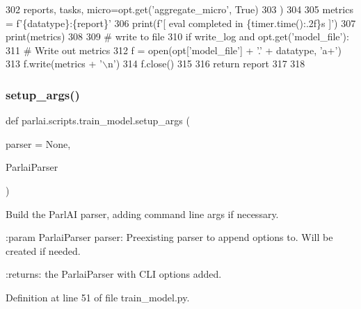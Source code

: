\begin{DoxyCode}
302         reports, tasks, micro=opt.get(\textcolor{stringliteral}{'aggregate\_micro'}, \textcolor{keyword}{True})
303     )
304 
305     metrics = f\textcolor{stringliteral}{'\{datatype\}:\{report\}'}
306     print(f\textcolor{stringliteral}{'[ eval completed in \{timer.time():.2f\}s ]'})
307     print(metrics)
308 
309     \textcolor{comment}{# write to file}
310     \textcolor{keywordflow}{if} write\_log \textcolor{keywordflow}{and} opt.get(\textcolor{stringliteral}{'model\_file'}):
311         \textcolor{comment}{# Write out metrics}
312         f = open(opt[\textcolor{stringliteral}{'model\_file'}] + \textcolor{stringliteral}{'.'} + datatype, \textcolor{stringliteral}{'a+'})
313         f.write(metrics + \textcolor{stringliteral}{'\(\backslash\)n'})
314         f.close()
315 
316     \textcolor{keywordflow}{return} report
317 
318 
\end{DoxyCode}
\mbox{\label{namespaceparlai_1_1scripts_1_1train__model_a5130cce2fb2a33694a2537d800ad9e9e}} 
\subsubsection{\texorpdfstring{setup\+\_\+args()}{setup\_args()}}
{\footnotesize\ttfamily def parlai.\+scripts.\+train\+\_\+model.\+setup\+\_\+args (\begin{DoxyParamCaption}\item[{}]{parser = {\ttfamily None},  }\item[{}]{Parlai\+Parser }\end{DoxyParamCaption})}

\begin{DoxyVerb}Build the ParlAI parser, adding command line args if necessary.

:param ParlaiParser parser:
    Preexisting parser to append options to. Will be created if needed.

:returns:
    the ParlaiParser with CLI options added.
\end{DoxyVerb}
 

Definition at line 51 of file train\+\_\+model.\+py.



